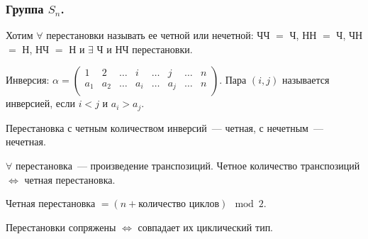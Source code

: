 \documentclass[12pt]{article}
\begin{document}
	\subsubsection{Группа $S_n$.}
	\begin{definition}
		Хотим $\forall$ перестановки называть ее четной или нечетной: ЧЧ $=$ Ч, НН $=$ Ч, ЧН $=$ Н, НЧ $=$ Н и $\exists$ Ч и НЧ перестановки.
	\end{definition}
	\begin{definition}
		Инверсия: $\alpha = \begin{pmatrix}
			1 & 2 & \dots & i & \dots & j & \dots & n \\
			a_1 & a_2 & \dots & a_i & \dots & a_j & \dots & n \\
		\end{pmatrix}$. Пара $(i, j)$ называется инверсией, если $i < j$ и $a_i > a_j$.
	\end{definition}
	\begin{definition}
		Перестановка с четным количеством инверсий~--- четная, с нечетным~--- нечетная.
	\end{definition}
	\begin{definition}
		$\forall$ перестановка~--- произведение транспозиций. Четное количество транспозиций $\Leftrightarrow$ четная перестановка.
	\end{definition}
	\begin{definition}
		Четная перестановка $= (n + \text{количество циклов}) \mod{2}$.
	\end{definition}
	\begin{theorem}
		Перестановки сопряжены $\Leftrightarrow$ совпадает их циклический тип.
	\end{theorem}
	
	
	
\end{document}
